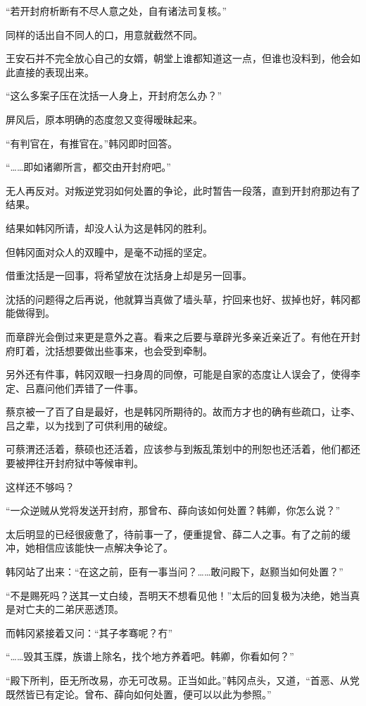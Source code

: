 “若开封府析断有不尽人意之处，自有诸法司复核。”

同样的话出自不同人的口，用意就截然不同。

王安石并不完全放心自己的女婿，朝堂上谁都知道这一点，但谁也没料到，他会如此直接的表现出来。

“这么多案子压在沈括一人身上，开封府怎么办？”

屏风后，原本明确的态度忽又变得暧昧起来。

“有判官在，有推官在。”韩冈即时回答。

“……即如诸卿所言，都交由开封府吧。”

无人再反对。对叛逆党羽如何处置的争论，此时暂告一段落，直到开封府那边有了结果。

结果如韩冈所请，却没人认为这是韩冈的胜利。

但韩冈面对众人的双瞳中，是毫不动摇的坚定。

借重沈括是一回事，将希望放在沈括身上却是另一回事。

沈括的问题得之后再说，他就算当真做了墙头草，拧回来也好、拔掉也好，韩冈都能做得到。

而章辟光会倒过来更是意外之喜。看来之后要与章辟光多亲近亲近了。有他在开封府盯着，沈括想要做出些事来，也会受到牵制。

另外还有件事，韩冈双眼一扫身周的同僚，可能是自家的态度让人误会了，使得李定、吕嘉问他们弄错了一件事。

蔡京被一了百了自是最好，也是韩冈所期待的。故而方才也的确有些疏口，让李、吕之辈，以为找到了可供利用的破绽。

可蔡渭还活着，蔡硕也还活着，应该参与到叛乱策划中的刑恕也还活着，他们都还要被押往开封府狱中等候审判。

这样还不够吗？

“一众逆贼从党将发送开封府，那曾布、薛向该如何处置？韩卿，你怎么说？”

太后明显的已经很疲惫了，待前事一了，便重提曾、薛二人之事。有了之前的缓冲，她相信应该能快一点解决争论了。

韩冈站了出来：“在这之前，臣有一事当问？……敢问殿下，赵颢当如何处置？”

“不是赐死吗？送其一丈白绫，吾明天不想看见他！”太后的回复极为决绝，她当真是对亡夫的二弟厌恶透顶。

而韩冈紧接着又问：“其子孝骞呢？冇”

“……毁其玉牒，族谱上除名，找个地方养着吧。韩卿，你看如何？”

“殿下所判，臣无所改易，亦无可改易。正当如此。”韩冈点头，又道，“首恶、从党既然皆已有定论。曾布、薛向如何处置，便可以以此为参照。”


